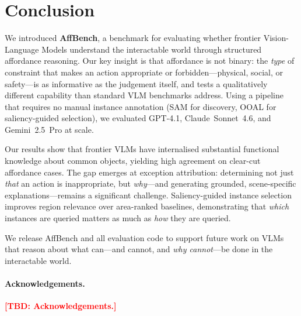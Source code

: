 \documentclass[runningheads]{llncs}
\newcommand{\TBD}[1]{\textcolor{red}{\textbf{[TBD: #1]}}}
\begin{document}
\section{Conclusion}
\label{sec:conclusion}

We introduced \textbf{AffBench}, a benchmark for evaluating whether
frontier Vision-Language Models understand the interactable world through
structured affordance reasoning. Our key insight is that affordance is not
binary: the \emph{type} of constraint that makes an action appropriate or
forbidden—physical, social, or safety—is as informative as the judgement
itself, and tests a qualitatively different capability than standard VLM
benchmarks address. Using a pipeline that requires no manual instance
annotation (SAM for discovery, OOAL for saliency-guided selection), we
evaluated GPT-4.1, Claude~Sonnet~4.6, and Gemini~2.5~Pro at scale.

Our results show that frontier VLMs have internalised substantial
functional knowledge about common objects, yielding high agreement on
clear-cut affordance cases. The gap emerges at exception attribution:
determining not just \emph{that} an action is inappropriate, but
\emph{why}—and generating grounded, scene-specific explanations—remains a
significant challenge. Saliency-guided instance selection improves region
relevance over area-ranked baselines, demonstrating that \emph{which}
instances are queried matters as much as \emph{how} they are queried.

We release AffBench and all evaluation code to support future work on
VLMs that reason about what can—and cannot, and \emph{why cannot}—be done
in the interactable world.

\paragraph{Acknowledgements.}
\TBD{Acknowledgements.}



\end{document}
